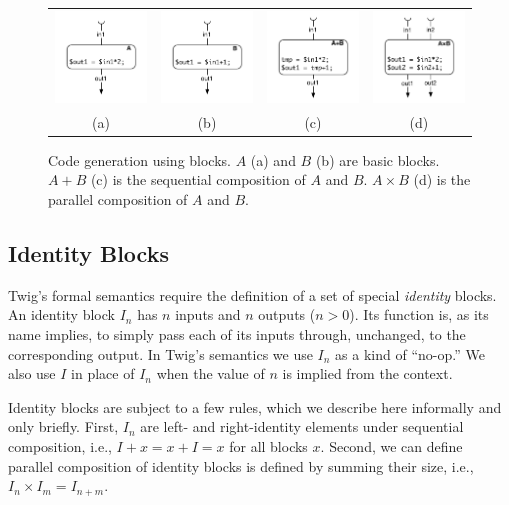 \begin{figure}[ht]
\centering
\begin{tabular}{cccc}
\includegraphics[width=1.1in]{images/codegen-a}& 
\includegraphics[width=1.1in]{images/codegen-b}& 
\includegraphics[width=1.1in]{images/codegen-seq}& 
\includegraphics[width=1.1in]{images/codegen-par}\\
(a)&(b)&(c)&(d)\\
\end{tabular}
\caption{Code generation using blocks. $A$ (a) and $B$ (b) are 
basic blocks. $A+B$ (c) is the sequential composition of $A$ and 
$B$. $A \times B$ (d) is the parallel composition of $A$ and $B$.}
\label{fig:codegen}
\end{figure}


\subsection{Identity Blocks}

Twig's formal semantics require the definition of a set of special
\emph{identity} blocks. An identity block $I_n$ has $n$ inputs and
$n$ outputs ($n > 0$). Its function is, as its name implies, to
simply pass each of its inputs through, unchanged, to the
corresponding output. In Twig's semantics we use $I_n$ as a kind
of ``no-op.'' We also use $I$ in place of $I_n$ when the value of
$n$ is implied from the context.

Identity blocks are subject to a few rules, which we describe here
informally and only briefly. First, $I_n$ are left- and
right-identity elements under sequential composition, i.e., $I + x
= x + I = x$ for all blocks $x$. Second, we can define parallel
composition of identity blocks is defined by summing their size,
i.e., $I_n \times I_m = I_{n + m}$.

